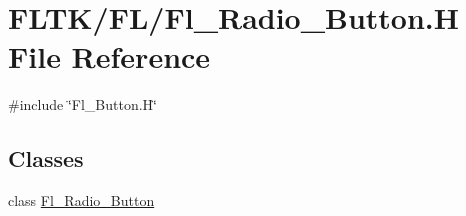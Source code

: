 \hypertarget{_fl___radio___button_8_h}{}\section{F\+L\+T\+K/\+F\+L/\+Fl\+\_\+\+Radio\+\_\+\+Button.H File Reference}
\label{_fl___radio___button_8_h}
{\ttfamily \#include \char`\"{}Fl\+\_\+\+Button.\+H\char`\"{}}\newline
\subsection*{Classes}
\begin{DoxyCompactItemize}
\item 
class \hyperlink{class_fl___radio___button}{Fl\+\_\+\+Radio\+\_\+\+Button}
\end{DoxyCompactItemize}
